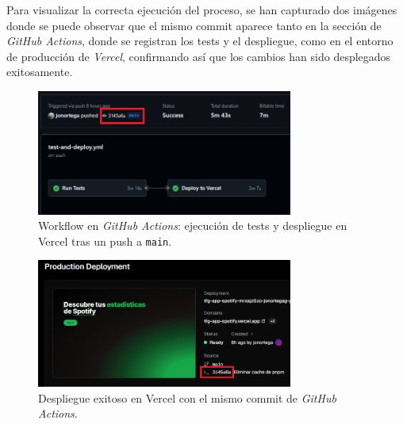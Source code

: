Para visualizar la correcta ejecución del proceso, se han capturado dos imágenes donde se puede observar que el mismo commit aparece tanto en la sección de \textit{GitHub Actions}, donde se registran los tests y el despliegue, como en el entorno de producción de \textit{Vercel}, confirmando así que los cambios han sido desplegados exitosamente.

\begin{figure}[H]
    \centering
    \includegraphics[width=0.75\textwidth]{figures/despliegue/github_actions.png}
    \caption{Workflow en \textit{GitHub Actions}: ejecución de tests y despliegue en Vercel tras un push a \texttt{main}.}
    \label{fig:github_actions}
\end{figure}

\begin{figure}[H]
    \centering
    \includegraphics[width=0.75\textwidth]{figures/despliegue/actions_deploy_vercel.png}
    \caption{Despliegue exitoso en Vercel con el mismo commit de \textit{GitHub Actions}.}
    \label{fig:actions_deploy_vercel}
\end{figure}